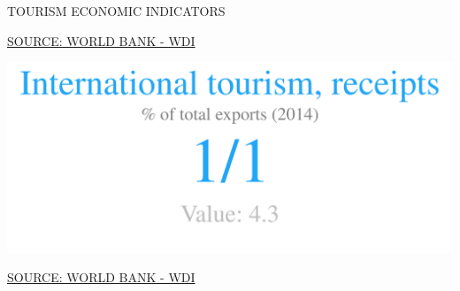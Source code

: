 \documentclass{article}\usepackage[]{graphicx}\usepackage[]{color}
\makeatletter
\def\maxwidth{ %
  \ifdim\Gin@nat@width>\linewidth
    \linewidth
  \else
    \Gin@nat@width
  \fi
}
\newenvironment{kframe}{%
 \def\at@end@of@kframe{}%
 \ifinner\ifhmode%
  \def\at@end@of@kframe{\end{minipage}}%
  \begin{minipage}{\columnwidth}%
 \fi\fi%
 \def\FrameCommand##1{\hskip\@totalleftmargin \hskip-\fboxsep
 \colorbox{shadecolor}{##1}\hskip-\fboxsep
     \hskip-\linewidth \hskip-\@totalleftmargin \hskip\columnwidth}%
 \MakeFramed {\advance\hsize-\width
   \@totalleftmargin\z@ \linewidth\hsize
   \@setminipage}}%
 {\par\unskip\endMakeFramed%
 \at@end@of@kframe}
\makeatother
\begin{document}
\begin{minipage}[c]{0.95\textwidth}
  \vspace{5ex}
  \begin{flushleft}  
    \hspace{4ex}\Large{\textcolor[HTML]{FF4023}{TOURISM ECONOMIC INDICATORS}}\hspace{2ex}\small{\textcolor[HTML]{818181} {}}
  \end{flushleft} 
  \begin{minipage}[c]{0.5\textwidth}
  \hspace{4ex}\small{\textcolor[HTML]{818181}{}}
    \vspace{1ex}
\begin{kframe}


{\ttfamily\noindent\bfseries\color{errorcolor}{\#\# Error in `[<-.data.frame`(`*tmp*`, data2\$IndicatorShort == "{} "{}, , value = structure(list(: missing values are not allowed in subscripted assignments of data frames}}\end{kframe}
  \hspace{4ex}\scriptsize{\href{NA}{\textcolor[HTML]{FF4023}{SOURCE: WORLD BANK - WDI}}}
  \end{minipage}
  \begin{minipage}[c]{0.5\textwidth}
  \hspace{4ex}\small{\textcolor[HTML]{818181}{}}
    \vspace{1ex}


{\centering \includegraphics[width=\maxwidth]{figure/numberBig2_1-1} 

}



  \hspace{4ex}\scriptsize{\href{NA}{\textcolor[HTML]{FF4023}{SOURCE: WORLD BANK - WDI}}}
  \end{minipage}
\end{minipage}
\end{document}
